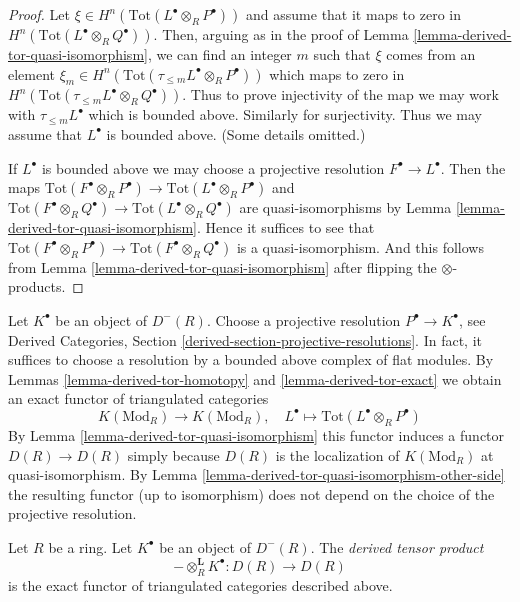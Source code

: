 \begin{proof}
Let $\xi \in H^n(\text{Tot}(L^\bullet \otimes_R P^\bullet))$ and assume
that it maps to zero in
$H^n(\text{Tot}(L^\bullet \otimes_R Q^\bullet))$.
Then, arguing as in the proof of
Lemma \ref{lemma-derived-tor-quasi-isomorphism},
we can find an integer $m$ such that $\xi$ comes from an element
$\xi_m \in H^n(\text{Tot}(\tau_{\leq m}L^\bullet \otimes_R P^\bullet))$
which maps to zero in
$H^n(\text{Tot}(\tau_{\leq m}L^\bullet \otimes_R Q^\bullet))$.
Thus to prove injectivity of the map we may work with
$\tau_{\leq m}L^\bullet$ which is bounded above.
Similarly for surjectivity. Thus we may assume that $L^\bullet$ is bounded
above. (Some details omitted.)

\medskip\noindent
If $L^\bullet$ is bounded above we may choose a projective resolution
$F^\bullet \to L^\bullet$. Then the maps
$\text{Tot}(F^\bullet \otimes_R P^\bullet) \to 
\text{Tot}(L^\bullet \otimes_R P^\bullet)$
and
$\text{Tot}(F^\bullet \otimes_R Q^\bullet) \to 
\text{Tot}(L^\bullet \otimes_R Q^\bullet)$
are quasi-isomorphisms by
Lemma \ref{lemma-derived-tor-quasi-isomorphism}.
Hence it suffices to see that
$\text{Tot}(F^\bullet \otimes_R P^\bullet) \to
\text{Tot}(F^\bullet \otimes_R Q^\bullet)$
is a quasi-isomorphism. And this follows from
Lemma \ref{lemma-derived-tor-quasi-isomorphism}
after flipping the $\otimes$-products.
\end{proof}

\noindent
Let $K^\bullet$ be an object of $D^{-}(R)$. 
Choose a projective resolution $P^\bullet \to K^\bullet$, see
Derived Categories, Section \ref{derived-section-projective-resolutions}.
In fact, it suffices to choose a resolution by a bounded above
complex of flat modules. By
Lemmas \ref{lemma-derived-tor-homotopy} and \ref{lemma-derived-tor-exact}
we obtain an exact functor of triangulated categories
$$
K(\text{Mod}_R) \longrightarrow K(\text{Mod}_R),\quad
L^\bullet \longmapsto \text{Tot}(L^\bullet \otimes_R P^\bullet)
$$
By
Lemma \ref{lemma-derived-tor-quasi-isomorphism}
this functor induces a functor $D(R) \to D(R)$ simply because
$D(R)$ is the localization of $K(\text{Mod}_R)$ at quasi-isomorphism.
By
Lemma \ref{lemma-derived-tor-quasi-isomorphism-other-side}
the resulting functor (up to isomorphism)
does not depend on the choice of the projective resolution.

\begin{definition}
\label{definition-derived-tor}
Let $R$ be a ring. Let $K^\bullet$ be an object of $D^{-}(R)$.
The {\it derived tensor product}
$$
- \otimes_R^{\mathbf{L}} K^\bullet : D(R) \longrightarrow D(R)
$$
is the exact functor of triangulated categories described above.
\end{definition}

